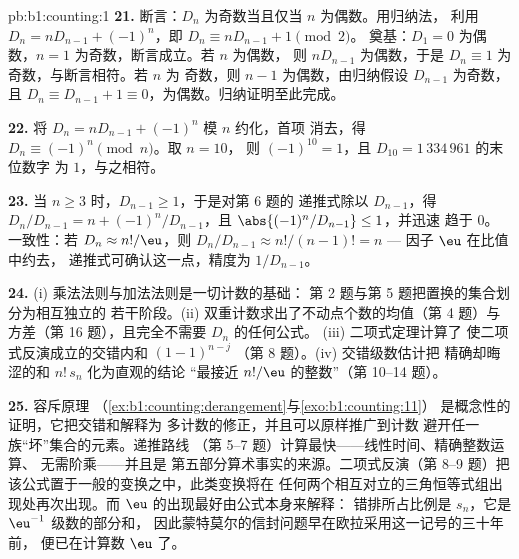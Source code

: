\begin{solution}{pb:b1:counting:1}
\textbf{21.} 断言：$D_n$ 为奇数当且仅当 $n$ 为偶数。用归纳法，
利用 $D_n = nD_{n-1} + (-1)^n$，即 $D_n \equiv nD_{n-1} + 1 \pmod 2$。
奠基：$D_1 = 0$ 为偶数，$n = 1$ 为奇数，断言成立。若 $n$ 为偶数，
则 $nD_{n-1}$ 为偶数，于是 $D_n \equiv 1$ 为奇数，与断言相符。若 $n$ 为
奇数，则 $n - 1$ 为偶数，由归纳假设 $D_{n-1}$ 为奇数，且
$D_n \equiv D_{n-1} + 1 \equiv 0$，为偶数。归纳证明至此完成。

\textbf{22.} 将 $D_n = nD_{n-1} + (-1)^n$ 模 $n$ 约化，首项
消去，得 $D_n \equiv (-1)^n \pmod n$。取 $n = 10$，
则 $(-1)^{10} = 1$，且 $D_{10} = 1\,334\,961$ 的末位数字
为 $1$，与之相符。

\textbf{23.} 当 $n \geq 3$ 时，$D_{n-1} \geq 1$，于是对第 6 题的
递推式除以 $D_{n-1}$，得 $D_n/D_{n-1} = n +
(-1)^n/D_{n-1}$，且 $\abs{(-1)^n/D_{n-1}} \leq 1$，并迅速
趋于 $0$。一致性：若 $D_n \approx n!/\eu$，则
$D_n/D_{n-1} \approx n!/(n-1)! = n$ --- 因子 $\eu$ 在比值中约去，
递推式可确认这一点，精度为
$1/D_{n-1}$。

\textbf{24.} (i) 乘法法则与加法法则是一切计数的基础：
第 2 题与第 5 题把置换的集合划分为相互独立的
若干阶段。(ii) 双重计数求出了不动点个数的均值（第 4 题）与
方差（第 16 题），且完全不需要 $D_n$ 的任何公式。
(iii) 二项式定理计算了
使二项式反演成立的交错内和 $(1-1)^{n-j}$
（第 8 题）。(iv) 交错级数估计把
精确却晦涩的和 $n!\,s_n$ 化为直观的结论
“最接近 $n!/\eu$ 的整数”（第 10--14 题）。

\textbf{25.} 容斥原理
（\cref{ex:b1:counting:derangement}与\cref{exo:b1:counting:11}）
是概念性的证明，它把交错和解释为
多计数的修正，并且可以原样推广到计数
避开任一族“坏”集合的元素。递推路线
（第 5--7 题）计算最快——线性时间、精确整数运算、
无需阶乘——并且是
第五部分算术事实的来源。二项式反演（第 8--9 题）把
该公式置于一般的变换之中，此类变换将在
任何两个相互对立的三角恒等式组出现处再次出现。而
$\eu$ 的出现最好由公式本身来解释：
错排所占比例是 $s_n$，它是 $\eu^{-1}$ 级数的部分和，
因此蒙特莫尔的信封问题早在欧拉采用这一记号的三十年前，
便已在计算数 $\eu$ 了。
\end{solution}
